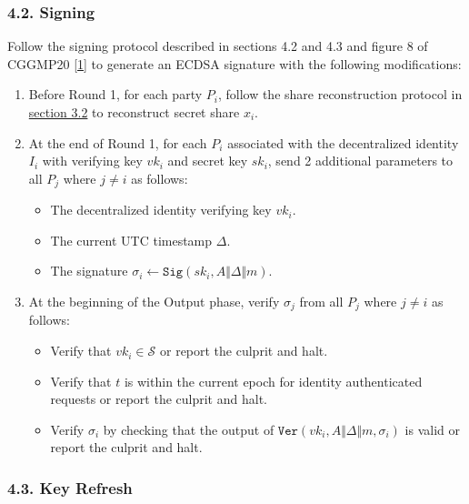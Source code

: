 \documentclass[
]{article}
\providecommand{\tightlist}{%
  \setlength{\itemsep}{0pt}\setlength{\parskip}{0pt}}
\begin{document}
\hypertarget{signing}{%
\subsubsection{4.2. Signing}\label{signing}}

Follow the signing protocol described in sections 4.2 and 4.3 and figure
8 of CGGMP20 {[}\protect\hyperlink{ref-cggmp20}{1}{]} to generate an
ECDSA signature with the following modifications:

\begin{enumerate}
\def\labelenumi{\arabic{enumi}.}
\tightlist
\item
  Before Round 1, for each party \(P_i\), follow the share
  reconstruction protocol in
  \protect\hyperlink{share-reconstruction}{section 3.2} to reconstruct
  secret share \(x_i\).
\item
  At the end of Round 1, for each \(P_i\) associated with the
  decentralized identity \(I_i\) with verifying key \(vk_i\) and secret
  key \(sk_i\), send 2 additional parameters to all \(P_j\) where
  \(j \neq i\) as follows:

  \begin{itemize}
  \tightlist
  \item
    The decentralized identity verifying key \(vk_i\).
  \item
    The current UTC timestamp \(\Delta\).
  \item
    The signature
    \(\sigma _i \leftarrow \mathtt{Sig}(sk_i, A \Vert \Delta \Vert m)\).
  \end{itemize}
\item
  At the beginning of the Output phase, verify \(\sigma _j\) from all
  \(P_j\) where \(j \neq i\) as follows:

  \begin{itemize}
  \tightlist
  \item
    Verify that \(vk_i \in \mathcal{S}\) or report the culprit and halt.
  \item
    Verify that \(t\) is within the current epoch for identity
    authenticated requests or report the culprit and halt.
  \item
    Verify \(\sigma _i\) by checking that the output of
    \(\mathtt{Ver}(vk_i, A \Vert \Delta \Vert m, \sigma _i)\) is valid
    or report the culprit and halt.
  \end{itemize}
\end{enumerate}

\hypertarget{key-refresh}{%
\subsubsection{4.3. Key Refresh}\label{key-refresh}}
\end{document}
